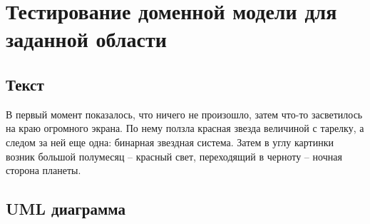 \documentclass[a4paper,10pt]{article}
\begin{document}
\section*{Тестирование доменной модели для заданной области}
    \subsection*{Текст}
        В первый момент показалось, что ничего не произошло, затем что-то засветилось на краю огромного экрана. 
        По нему ползла красная звезда величиной с тарелку, а следом за ней еще одна: бинарная звездная система.
        Затем в углу картинки возник большой полумесяц -- красный свет, переходящий в черноту -- ночная сторона планеты. 
    \subsection*{UML диаграмма}
\end{document}
